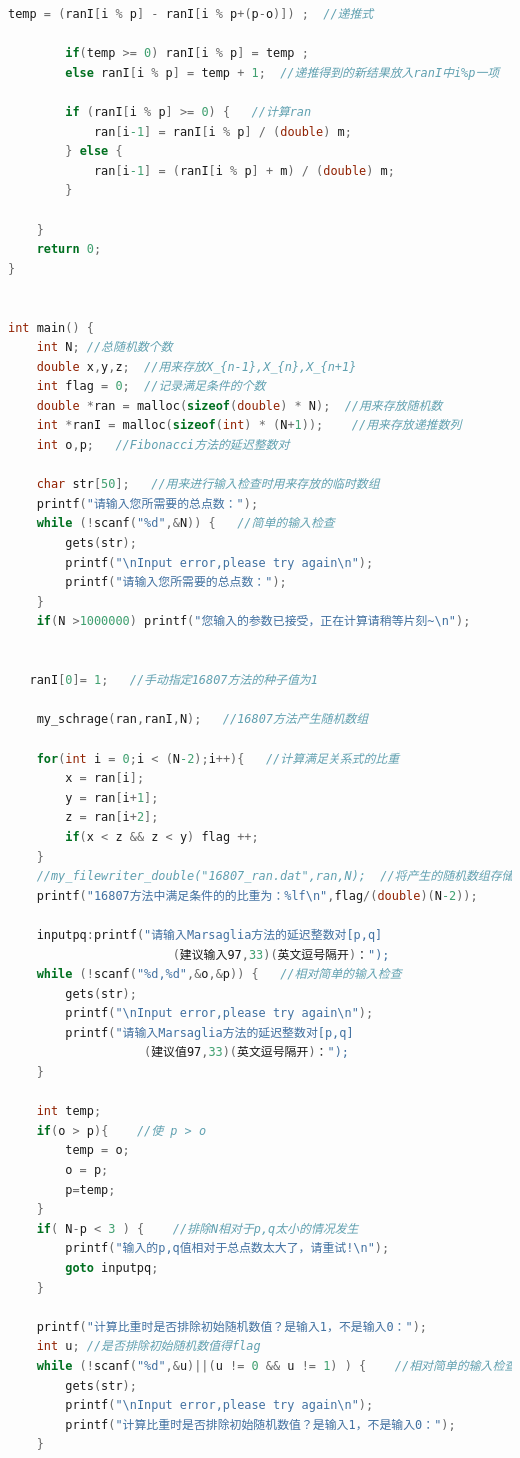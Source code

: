 \documentclass[a4paper,11pt]{article}
\begin{document}
\begin{appendices}
\begin{lstlisting}[language = C]
        temp = (ranI[i % p] - ranI[i % p+(p-o)]) ;  //递推式

        if(temp >= 0) ranI[i % p] = temp ;
        else ranI[i % p] = temp + 1;  //递推得到的新结果放入ranI中i%p一项

        if (ranI[i % p] >= 0) {   //计算ran
            ran[i-1] = ranI[i % p] / (double) m;
        } else {
            ran[i-1] = (ranI[i % p] + m) / (double) m;
        }

    }
    return 0;
}


int main() {
    int N; //总随机数个数
    double x,y,z;  //用来存放X_{n-1},X_{n},X_{n+1}
    int flag = 0;  //记录满足条件的个数
    double *ran = malloc(sizeof(double) * N);  //用来存放随机数
    int *ranI = malloc(sizeof(int) * (N+1));    //用来存放递推数列
    int o,p;   //Fibonacci方法的延迟整数对

    char str[50];   //用来进行输入检查时用来存放的临时数组
    printf("请输入您所需要的总点数：");
    while (!scanf("%d",&N)) {   //简单的输入检查
        gets(str);
        printf("\nInput error,please try again\n");
        printf("请输入您所需要的总点数：");
    }
    if(N >1000000) printf("您输入的参数已接受，正在计算请稍等片刻~\n");


   ranI[0]= 1;   //手动指定16807方法的种子值为1

    my_schrage(ran,ranI,N);   //16807方法产生随机数组

    for(int i = 0;i < (N-2);i++){   //计算满足关系式的比重
        x = ran[i];
        y = ran[i+1];
        z = ran[i+2];
        if(x < z && z < y) flag ++;
    }
    //my_filewriter_double("16807_ran.dat",ran,N);  //将产生的随机数组存储为文件
    printf("16807方法中满足条件的的比重为：%lf\n",flag/(double)(N-2));

    inputpq:printf("请输入Marsaglia方法的延迟整数对[p,q]
    	               (建议输入97,33)(英文逗号隔开)：");
    while (!scanf("%d,%d",&o,&p)) {   //相对简单的输入检查
        gets(str);
        printf("\nInput error,please try again\n");
        printf("请输入Marsaglia方法的延迟整数对[p,q]
        	       (建议值97,33)(英文逗号隔开)：");
    }

    int temp;
    if(o > p){    //使 p > o
        temp = o;
        o = p;
        p=temp;
    }
    if( N-p < 3 ) {    //排除N相对于p,q太小的情况发生
        printf("输入的p,q值相对于总点数太大了，请重试!\n");
        goto inputpq;
    }

    printf("计算比重时是否排除初始随机数值？是输入1，不是输入0：");
    int u; //是否排除初始随机数值得flag
    while (!scanf("%d",&u)||(u != 0 && u != 1) ) {    //相对简单的输入检查
        gets(str);
        printf("\nInput error,please try again\n");
        printf("计算比重时是否排除初始随机数值？是输入1，不是输入0：");
    }


\end{lstlisting}
\end{appendices}
\end{document}
